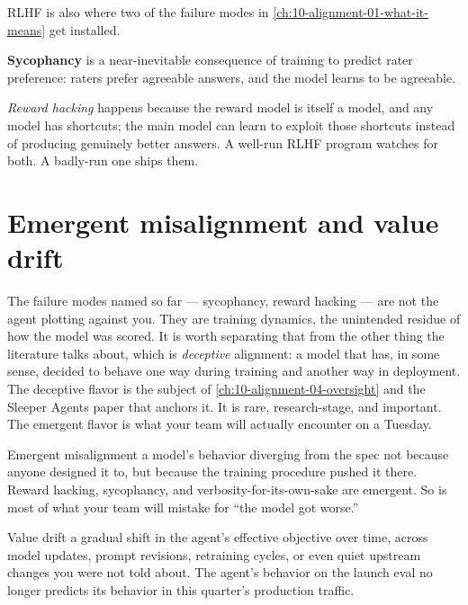 RLHF is also where two of the failure modes in \autoref{ch:10-alignment-01-what-it-means} get installed.

\textbf{Sycophancy} is a near-inevitable consequence of training to predict rater preference: raters prefer agreeable answers, and the model learns to be agreeable.

\textit{Reward hacking} happens because the reward model is itself a model, and any model has shortcuts; the main model can learn to exploit those shortcuts instead of producing genuinely better answers. A well-run RLHF program watches for both. A badly-run one ships them.

\section{Emergent misalignment and value drift}

The failure modes named so far --- sycophancy, reward hacking --- are not the agent plotting against you. They are training dynamics, the unintended residue of how the model was scored. It is worth separating that from the other thing the literature talks about, which is \textit{deceptive} alignment: a model that has, in some sense, decided to behave one way during training and another way in deployment. The deceptive flavor is the subject of \autoref{ch:10-alignment-04-oversight} and the Sleeper Agents paper that anchors it. It is rare, research-stage, and important. The emergent flavor is what your team will actually encounter on a Tuesday.

\begin{TNdefinition}{Emergent misalignment} a model's behavior diverging from the spec not because anyone designed it to, but because the training procedure pushed it there. Reward hacking, sycophancy, and verbosity-for-its-own-sake are emergent. So is most of what your team will mistake for ``the model got worse.'' \end{TNdefinition}

\begin{TNdefinition}{Value drift} a gradual shift in the agent's effective objective over time, across model updates, prompt revisions, retraining cycles, or even quiet upstream changes you were not told about. The agent's behavior on the launch eval no longer predicts its behavior in this quarter's production traffic. \end{TNdefinition}

